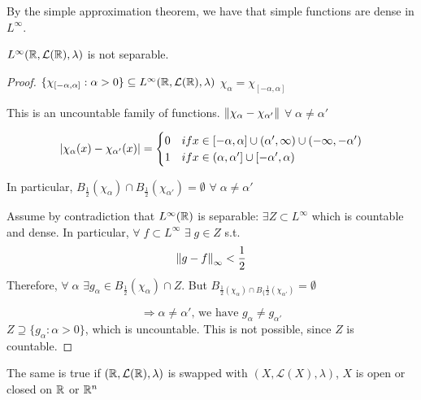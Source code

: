 By the simple approximation theorem, we have that simple functions are dense in \(L^\infty\).
\begin{theorem}
    \(L^{\infty}(\mathbb{R}, \mathcal{L}(\mathbb{R}), \lambda)\) is not separable.
\end{theorem}
\begin{proof}
    \(\{\chi_{[-\alpha, \alpha]}: \alpha >0\} \subseteq L^{\infty}(\mathbb{R}, \mathcal{L}(\mathbb{R}), \lambda)\)
    \(\chi_\alpha = \chi_{[-\alpha, \alpha]}\)

    This is an uncountable family of functions. \(\norm{\chi_\alpha - \chi_{\alpha'}}\) \(\forall \; \alpha \neq \alpha'\)

    \[
        \abs{\chi_\alpha(x) - \chi_{\alpha'}(x)} =
        \begin{cases}
            0 & if x \in [-\alpha, \alpha] \cup (\alpha', \infty) \cup (-\infty, -\alpha')\\
            1 & if x \in (\alpha, \alpha'] \cup [-\alpha', \alpha)    
        \end{cases}
    \]

    In particular, \(B_{\frac{1}{2}}(\chi_\alpha) \cap B_{\frac{1}{2}}(\chi_{\alpha '}) = \emptyset \) \(\forall \; \alpha \neq \alpha'\)

    Assume by contradiction that \(L^\infty(\mathbb{R})\) is separable: \(\exists Z \subset L^\infty\) which is countable and dense. In particular, \(\forall \; f \subset L^\infty\) \(\exists \; g \in Z\) s.t. 
    \[
        \norm{g-f }_\infty < \frac{1}{2}
    \]
    Therefore, \(\forall \; \alpha\) \(\exists g_\alpha \in B_{\frac{1}{2}}(\chi_\alpha) \cap Z\). 
    But \( B_{\frac{1}{2}(\chi_\alpha) \cap B_\{\frac{1}{2}(\chi_{\alpha'})} = \emptyset \)

    \[
        \Rightarrow \alpha \neq \alpha' \text{, we have } g_\alpha \neq g_{\alpha'}
    \]
    \(Z \supseteq \{ g_\alpha : \alpha >0 \}\), which is uncountable. This is not possible, since \(Z\) is countable.
\end{proof}

\begin{remark}
    The same is true if \((\mathbb{R}, \mathcal{L}(\mathbb{R}), \lambda)\) is swapped with \((X, \mathcal{L}(X), \lambda)\), \(X\) is open or closed on \(\mathbb{R}\) or \(\mathbb{R}^n\)
\end{remark}

